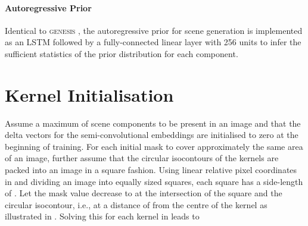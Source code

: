 \documentclass{article}
\begin{document}
\paragraph{Autoregressive Prior}
Identical to \textsc{genesis} \cite{engelcke2020genesis}, the autoregressive prior for scene generation is implemented as an LSTM \citep{hochreiter1997long} followed by a fully-connected linear layer with 256 units to infer the sufficient statistics of the prior distribution for each component.

\section{Kernel Initialisation}
\label{app:kernel_initialisation}

Assume a maximum of  scene components to be present in an image and that the delta vectors for the semi-convolutional embeddings are initialised to zero at the beginning of training.
For each initial mask to cover approximately the same area of an image, further assume that the circular isocontours of the kernels are packed into an image in a square fashion.
Using linear relative pixel coordinates in  and dividing an image into  equally sized squares, each square has a side-length of .
Let the mask value decrease to  at the intersection of the square and the circular isocontour, i.e., at a distance of  from the centre of the kernel as illustrated in .
Solving this for each kernel in  leads to
\end{document}
